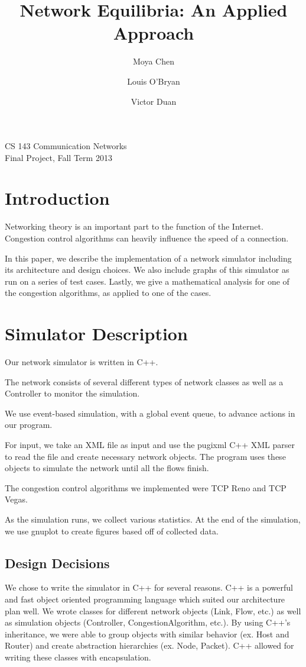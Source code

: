 \documentclass{article}
\title{Network Equilibria: An Applied Approach}
\author{Moya Chen \and Louis O'Bryan \and Victor Duan}
\begin{document}
\begin{titlepage}
    \maketitle
    \vfill
    \begin{center}
        {\large CS 143 Communication Networks \\ Final Project, Fall Term 2013}
    \end{center}
    \vfill
    \thispagestyle{empty}
\end{titlepage}

\tableofcontents
\newpage

\section{Introduction}
Networking theory is an important part to the function of the Internet. Congestion control algorithms can heavily influence the speed of a connection. 

In this paper, we describe the implementation of a network simulator including its architecture and design choices. We also include graphs of this simulator as run on a series of test cases. Lastly, we give a mathematical analysis for one of the congestion algorithms, as applied to one of the cases.

\section{Simulator Description}
    Our network simulator is written in C++. 
    
    The network consists of several different types of network classes as well as a Controller to monitor the simulation. 
    
    We use event-based simulation, with a global event queue, to advance actions in our program. 
    
    For input, we take an XML file as input and use the pugixml C++ XML parser to read the file and create necessary network objects. The program uses these objects to simulate the network until all the flows finish. 
    
    The congestion control algorithms we implemented were TCP Reno and TCP Vegas.

     As the simulation runs, we collect various statistics. At the end of the simulation, we use gnuplot to create figures based off of collected data.

\subsection{Design Decisions}
    We chose to write the simulator in C++ for several reasons. C++ is a powerful and fast object oriented programming language which suited our architecture plan well. We wrote classes for different network objects (Link, Flow, etc.) as well as simulation objects (Controller, CongestionAlgorithm, etc.). By using C++’s inheritance, we were able to group objects with similar behavior (ex. Host and Router) and create abstraction hierarchies (ex. Node, Packet).  C++ allowed for writing these classes with encapsulation.
\end{document}
